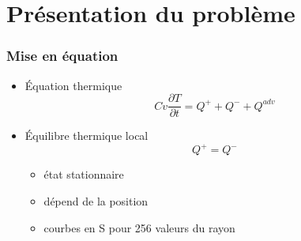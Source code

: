 \documentclass[french]{beamer}
\begin{document}




\section{Présentation du problème}
\begin{frame}
\frametitle{Mise en équation}

   \begin{itemize}
      \item Équation thermique
      \begin{equation}
         Cv\frac{\partial T}{\partial t} = Q^+ + Q^- +Q^{adv}
      \end{equation}
      
   \item Équilibre thermique local
   \begin{equation}
      Q^+ = Q^- 
   \end{equation}
   
      \begin{itemize}
         \item état stationnaire
         \\
         \item dépend de la position
         \item courbes en S pour 256 valeurs du rayon
      \end{itemize}
\end{itemize}
\end{frame}

\end{document}
